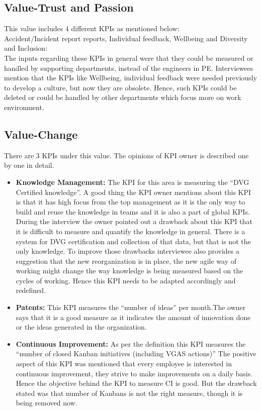 \subsection{Value-Trust and Passion}
This value includes 4 different KPIs as mentioned below:\\
Accident/Incident report reports, Individual feedback, Wellbeing and Diversity and Inclusion:\\

The inputs regarding these KPIs in general were that they could be measured or handled by supporting departments, instead of the engineers in PE. 
Interviewees mention that the KPIs like Wellbeing, individual feedback were needed previously to develop a culture, but now they are obsolete. Hence, such KPIs could be deleted or could be handled by other departments which focus more on work environment.

\subsection{Value-Change}
There are 3 KPIs under this value. The opinions of KPI owner is described one by one in detail.

\begin{itemize}
    
     \item \textbf{Knowledge Management:} The KPI for this area is measuring the “DVG Certified knowledge”.
A good thing the KPI owner mentions about this KPI is that it has high focus from the top management as it is the only way to build and reuse the knowledge in teams and it is also a part of global KPIs.
During the interview the owner pointed out a drawback about this KPI that it is difficult to measure and quantify the knowledge in general. There is a system for DVG certification and collection of that data, but that is not the only knowledge.
To improve those drawbacks interviewee also provides a suggestion that the new reorganization is in place, the new agile way of working might change the way knowledge is being measured based on the cycles of working. Hence this KPI needs to be adapted accordingly and redefined.

\item \textbf{Patents:} This KPI measures the “number of ideas” per month.The owner says that it is a good measure as it indicates the amount of innovation done or the ideas generated in the organization.

\item \textbf{Continuous Improvement:} As per the definition this KPI measures the “number of closed Kanban initiatives (including VGAS actions)”
The positive aspect of this KPI was mentioned that every employee is interested in continuous improvement, they strive to make improvements on a daily basis. Hence the objective behind the KPI to measure CI is good. But the drawback stated was that number of Kanbans is not the right measure, though it is being removed now.
\\
\end{itemize}

